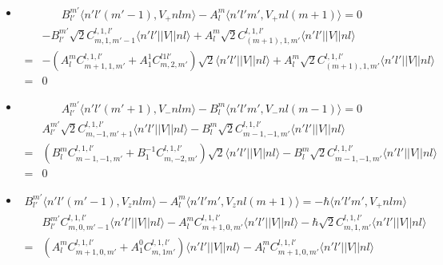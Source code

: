 \begin{enumerate}
    \begin{itemize}
        \item 
         \begin{align*}
        B^{m'}_{l'}\langle n'l'(m'-1),V_+nlm\rangle
        -A^m_l\langle n'l'm',V_+nl(m+1)\rangle= 0
    \end{align*}
    \begin{align*}
        &-B^{m'}_{l'}
        \sqrt{2}C^{l,1,l'}_{m,1,m'-1}
        \langle n'l'||V||nl\rangle
        +
        A^m_l\sqrt{2}
        C^{l,1,l'}_{(m+1),1,m'}
        \langle n'l'||V||nl\rangle\\
        =&
        -
        (A^m_lC^{l,1,l'}_{m+1,1,m'}
        +A^1_1C^{l1l'}_{m,2,m'})
        \sqrt{2}
        \langle n'l'||V||nl\rangle
        +
        A^m_l\sqrt{2}
        C^{l,1,l'}_{(m+1),1,m'}
        \langle n'l'||V||nl\rangle\\
        =&0
    \end{align*}
    \item 
    \begin{align*}
        A^{m'}_{l'}\langle n'l'(m'+1),V_-nlm\rangle
        -B^m_l\langle n'l'm',V_-nl(m-1)\rangle= 0
    \end{align*}
    \begin{align*}
        &A^{m'}_{l'}\sqrt{2}C^{l,1,l'}_{m,-1,m'+1}\langle n'l'||V||nl\rangle
        -B^m_l\sqrt{2}C^{l,1,l'}_{m-1,-1,m'}\langle n'l'||V||nl\rangle\\
        =&
        (B^m_lC^{l,1,l'}_{m-1,-1,m'}+B^{-1}_1C^{l,1,l'}_{m,-2,m'})\sqrt{2}\langle n'l'||V||nl\rangle
        -B^m_l\sqrt{2}C^{l,1,l'}_{m-1,-1,m'}\langle n'l'||V||nl\rangle\\
        =&0
    \end{align*}
    \item 
    \begin{align*}
        B^{m'}_{l'}\langle n'l'(m'-1),V_znlm\rangle 
        -A^m_l\langle n'l'm',V_znl(m+1)\rangle=
        -\hbar\langle n'l'm', V_+nlm\rangle
    \end{align*}
    \begin{align*}
        &B^{m'}_{l'}
        C^{l,1,l'}_{m,0,m'-1}
        \langle n'l'||V||nl\rangle
        -A^m_l 
        C^{l,1,l'}_{m+1,0,m'}
        \langle n'l'||V||nl\rangle
        -\hbar \sqrt{2}C^{l,1,l'}_{m,1,m'}
        \langle n'l'||V||nl\rangle\\
        =&
        (A^m_lC^{l,1,l'}_{m+1,0,m'}+A^0_1C^{l,1,l'}_{m,1m'})\langle n'l'||V||nl\rangle
        -A^m_l 
        C^{l,1,l'}_{m+1,0,m'}
        \langle n'l'||V||nl\rangle

\end{align*}
\end{itemize}
\end{enumerate}
